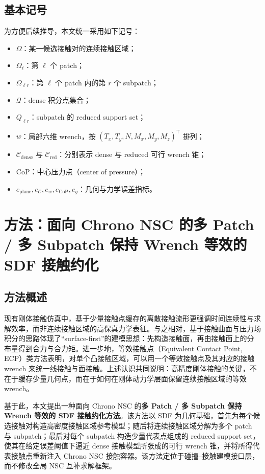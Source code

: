 \documentclass[UTF8,a4paper,11pt]{ctexart}
\begin{document}
\subsection{基本记号}

为方便后续推导，本文统一采用如下记号：
\begin{itemize}[leftmargin=2em]
    \item $\Omega$：某一候选接触对的连续接触区域；
    \item $\Omega_\ell$：第 $\ell$ 个 patch；
    \item $\Omega_{\ell r}$：第 $\ell$ 个 patch 内的第 $r$ 个 subpatch；
    \item $\mathcal{Q}$：dense 积分点集合；
    \item $Q_{\ell r}$：subpatch 的 reduced support set；
    \item $w$：局部六维 wrench，按 $(T_x,T_y,N,M_x,M_y,M_z)^\top$ 排列；
    \item $\mathcal{C}_{\mathrm{dense}}$ 与 $\mathcal{C}_{\mathrm{red}}$：分别表示 dense 与 reduced 可行 wrench 锥；
    \item CoP：中心压力点（center of pressure）；
    \item $e_{\mathrm{plane}}, e_{\mathcal{C}}, e_w, e_{\mathrm{CoP}}, e_g$：几何与力学误差指标。
\end{itemize}

\section{方法：面向 Chrono NSC 的多 Patch / 多 Subpatch 保持 Wrench 等效的 SDF 接触约化}
\label{sec:method}

\subsection{方法概述}

现有刚体接触仿真中，基于少量接触点缓存的离散接触流形更强调时间连续性与求解效率，而非连续接触区域的高保真力学表征。与之相对，基于接触曲面与压力场积分的思路体现了“surface-first”的建模思想：先构造接触面，再由接触面上的分布量得到合力与合力矩。进一步地，等效接触点（Equivalent Contact Point, ECP）类方法表明，对单个凸接触区域，可以用一个等效接触点及其对应的接触 wrench 来统一线接触与面接触。上述认识共同说明：高精度刚体接触的关键，不在于缓存少量几何点，而在于如何在刚体动力学层面保留连续接触区域的等效 wrench。

基于此，本文提出一种面向 Chrono NSC 的\textbf{多 Patch / 多 Subpatch 保持 Wrench 等效的 SDF 接触约化方法}。该方法以 SDF 为几何基础，首先为每个候选接触对构造高密度接触区域参考模型；随后将连续接触区域分解为多个 patch 与 subpatch；最后对每个 subpatch 构造少量代表点组成的 reduced support set，使其在给定误差阈值下逼近 dense 接触模型所张成的可行 wrench 锥，并将所得代表接触点重新注入 Chrono NSC 接触容器。该方法定位于碰撞--接触建模接口层，而不修改全局 NSC 互补求解框架。
\end{document}
